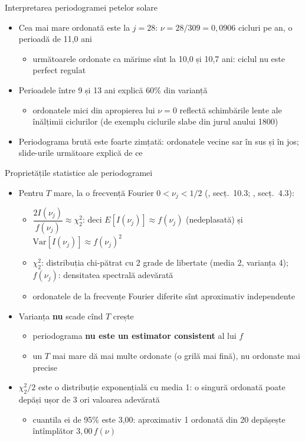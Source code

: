 \begin{frame}{Interpretarea periodogramei petelor solare}
\itemsize{\small}
\begin{itemize}
    \item Cea mai mare ordonată este la $j = 28$: $\nu = 28/309 = 0{,}0906$ cicluri pe an, o perioadă de 11{,}0 ani
    \begin{itemize}
        \item următoarele ordonate ca mărime sînt la 10{,}0 și 10{,}7 ani: ciclul nu este perfect regulat
    \end{itemize}
    \item Perioadele între 9 și 13 ani explică 60\% din varianță
    \begin{itemize}
        \item ordonatele mici din apropierea lui $\nu = 0$ reflectă schimbările lente ale înălțimii ciclurilor (de exemplu ciclurile slabe din jurul anului 1800)
    \end{itemize}
    \item Periodograma brută este foarte zimțată: ordonatele vecine sar în sus și în jos; slide-urile următoare explică de ce
\end{itemize}
\end{frame}

\begin{frame}{Proprietățile statistice ale periodogramei}
\itemsize{\footnotesize}
\begin{itemize}
    \item Pentru $T$ mare, la o frecvență Fourier $0 < \nu_j < 1/2$ (, secț.~10.3; , secț.~4.3):
    \begin{itemize}
        \item $\dfrac{2I(\nu_j)}{f(\nu_j)} \approx \chi^2_2$: deci $E[I(\nu_j)] \approx f(\nu_j)$ (nedeplasată) și $\mathrm{Var}[I(\nu_j)] \approx f(\nu_j)^2$
        \item $\chi^2_2$: distribuția chi-pătrat cu 2 grade de libertate (media 2, varianța 4); $f(\nu_j)$: densitatea spectrală adevărată
        \item ordonatele de la frecvențe Fourier diferite sînt aproximativ independente
    \end{itemize}
    \item Varianța \textbf{nu} scade cînd $T$ crește
    \begin{itemize}
        \item periodograma \textbf{nu este un estimator consistent} al lui $f$
        \item un $T$ mai mare dă mai multe ordonate (o grilă mai fină), nu ordonate mai precise
    \end{itemize}
    \item $\chi^2_2/2$ este o distribuție exponențială cu media 1: o singură ordonată poate depăși ușor de 3 ori valoarea adevărată
    \begin{itemize}
        \item cuantila ei de 95\% este 3{,}00: aproximativ 1 ordonată din 20 depășește întîmplător $3{,}00\,f(\nu)$
    \end{itemize}
\end{itemize}
\end{frame}

